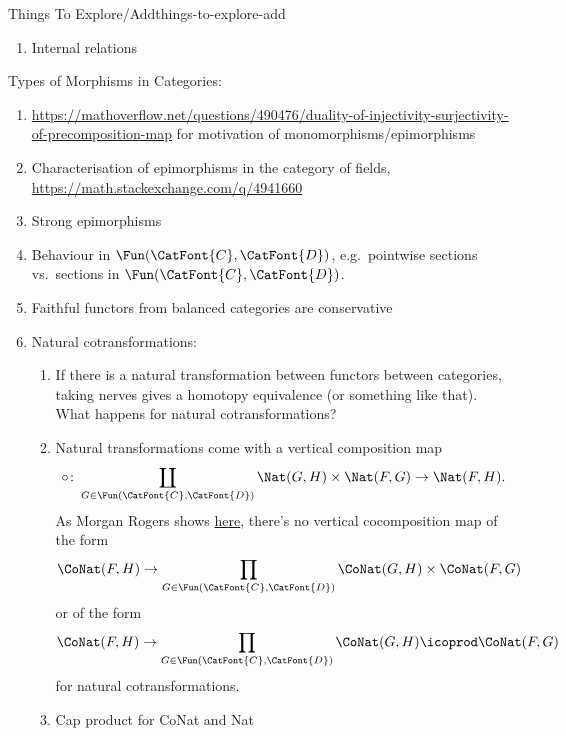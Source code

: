 \begin{remark}{Things To Explore/Add}{things-to-explore-add}
\begin{enumerate}
        \item Internal relations
    \end{enumerate}
    Types of Morphisms in Categories:
    \begin{enumerate}
        \item \url{https://mathoverflow.net/questions/490476/duality-of-injectivity-surjectivity-of-precomposition-map} for motivation of monomorphisms/epimorphisms
        \item Characterisation of epimorphisms in the category of fields, \url{https://math.stackexchange.com/q/4941660}
        \item Strong epimorphisms
        \item Behaviour in $\Fun(\CatFont{C},\CatFont{D})$, e.g.\ pointwise sections vs.\ sections in $\Fun(\CatFont{C},\CatFont{D})$.
        \item Faithful functors from balanced categories are conservative
        \item Natural cotransformations:
            \begin{enumerate}
                \item If there is a natural transformation between functors between categories, taking nerves gives a homotopy equivalence (or something like that). What happens for natural cotransformations?
                \item Natural transformations come with a vertical composition map
                    \[
                        \circ%
                        \colon%
                        \coprod_{G\in\Fun(\CatFont{C},\CatFont{D})}\Nat(G,H)\times\Nat(F,G)%
                        \to%
                        \Nat(F,H).%
                    \]%
                    As Morgan Rogers shows \href{https://categorytheory.zulipchat.com/#narrow/stream/229136-theory.3A-category-theory/topic/.E2.80.9CNatural.20cotransformations.E2.80.9D/near/436863628}{here}, there's no vertical cocomposition map of the form
                    \[
                        \CoNat(F,H)%
                        \to%
                        \prod_{G\in\Fun(\CatFont{C},\CatFont{D})}\CoNat(G,H)\times\CoNat(F,G)%
                    \]%
                    or of the form
                    \[
                        \CoNat(F,H)%
                        \to%
                        \prod_{G\in\Fun(\CatFont{C},\CatFont{D})}\CoNat(G,H)\icoprod\CoNat(F,G)%
                    \]%
                    for natural cotransformations.
                \item Cap product for CoNat and Nat

\end{enumerate}
\end{enumerate}
\end{remark}
